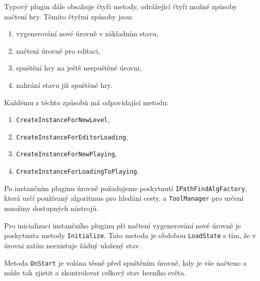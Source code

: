 Typový plugin dále obsahuje čtyři metody, odrážející čtyři možné způsoby načtení hry. Těmito čtyřmi způsoby jsou:

\begin{enumerate}
	\item vygenerování nové úrovně v základním stavu,
	\item načtení úrovně pro editaci,
	\item spuštění hry na ještě nespuštěné úrovni,
	\item nahrání stavu již spuštěné hry.
\end{enumerate}

Každému z těchto způsobů má odpovídající metodu:
\begin{enumerate}
	\item \texttt{CreateInstanceForNewLevel},
	\item \texttt{CreateInstanceForEditorLoading},
	\item \texttt{CreateInstanceForNewPlaying},
	\item \texttt{CreateInstanceForLoadingToPlaying}.
\end{enumerate}

Po instančním pluginu úrovně požadujeme poskytnutí \texttt{IPathFindAlgFactory}, která určí používaný algoritmus pro hledání cesty, a \texttt{ToolManager} pro určení množiny dostupných nástrojů.

Pro inicializaci instančního pluginu při načtení vygenerování nové úrovně je poskytnuta metody \texttt{Initialize}. Tato metoda je obdobou \texttt{LoadState} s tím, že v úrovni zatím neexistuje žádný uložený stav.

Metoda \texttt{OnStart} je volána těsně před spuštěním úrovně, kdy je vše načteno a může tak zjistit a zkontrolovat celkový stav herního světa.



